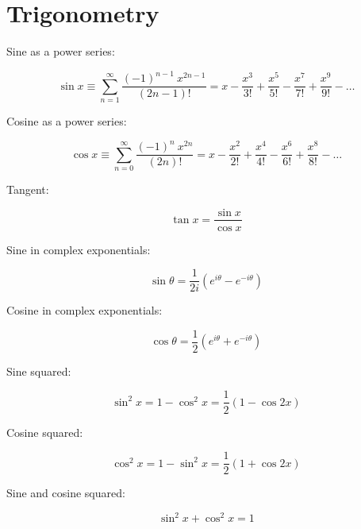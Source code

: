 \chapter{Trigonometry}
\label{sec:trig}

Sine as a power series:

\begin{equation}
    \sin x \equiv \sum_{n = 1}^{\infty} \frac{(-1)^{n - 1} \ x^{2n - 1}}{(2n - 1)!} = x - \frac{x^3}{3!} + \frac{x^5}{5!} - \frac{x^7}{7!} + \frac{x^9}{9!} - \dots
    \label{eq:sin_power_series}
\end{equation}

Cosine as a power series:

\begin{equation}
    \cos x \equiv \sum_{n = 0}^{\infty} \frac{(-1)^n \ x^{2n}}{(2n)!} = x - \frac{x^2}{2!} + \frac{x^4}{4!} - \frac{x^6}{6!} + \frac{x^8}{8!} - \dots
    \label{eq:cos_power_series}
\end{equation}

Tangent:

\begin{equation}
    \tan x = \frac{\sin x}{\cos x}
    \label{eq:tan}
\end{equation}

Sine in complex exponentials:

\begin{equation}
    \sin \theta = \frac{1}{2i} (e^{i\theta} - e^{-i\theta})
    \label{eq:sin_complex_exp}
\end{equation}

Cosine in complex exponentials:

\begin{equation}
    \cos \theta = \frac{1}{2} (e^{i\theta} + e^{-i\theta})
    \label{eq:cos_complex_exp}
\end{equation}

Sine squared:

\begin{equation}
    \sin^2 x = 1 - \cos^2 x = \frac{1}{2} (1 - \cos 2x)
    \label{eq:sin_squared}
\end{equation}

Cosine squared:

\begin{equation}
    \cos^2 x = 1 - \sin^2 x = \frac{1}{2} (1 + \cos 2x)
    \label{eq:cos_squared}
\end{equation}

Sine and cosine squared:

\begin{equation}
    \sin^2 x + \cos^2 x = 1
    \label{eq:sin_cos_squared}
\end{equation}

